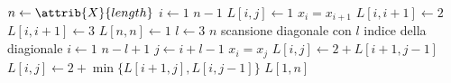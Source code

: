 \begin{codebox}
\li $n \gets \attrib{X}{length}$
\li \For $i \gets 1$ \To $n-1$
\li \Do
		$L[i,j] \gets 1$
\li		\If $x_i = x_{i+1}$
\li		\Then
			$L[i,i+1] \gets 2$
\li		\Else
\li			$L[i,i+1] \gets 3$
		\End
	\End
\li	$L[n,n] \gets 1$
\li \For $l \gets 3$ \To $n$
		\Comment scansione diagonale con $l$ indice della diagionale
\li	\Do
		\For $i \gets 1$ \To $n-l+1$
\li		\Do
			$j \gets i+l-1$
\li			\If $x_i = x_j$
\li			\Then
				$L[i,j] \gets 2 + L[i+1,j-1]$
\li			\Else
\li				$L[i,j] \gets 2 + \min\{L[i+1,j],L[i,j-1]\}$
			\End
		\End
	\End
\li \Return $L[1,n]$
\end{codebox}